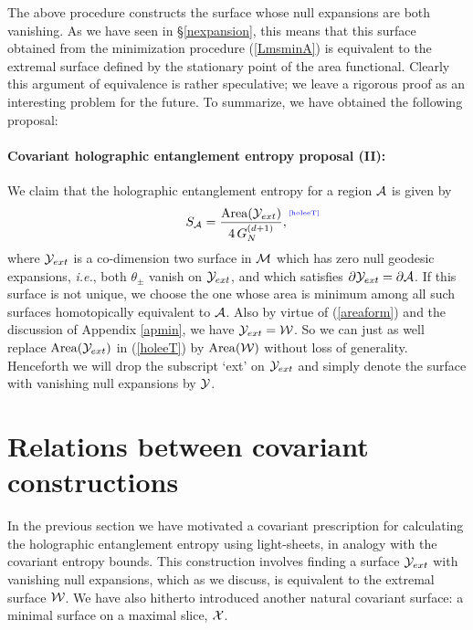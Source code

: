 \documentclass[12pt]{article}
\def\sec#1{\S \;\ref{#1}}
\def\req#1{(\ref{#1})}
\def\App#1{Appendix \ref{#1}}
\def\ie{{\it i.e.}}
\def\p{\partial}
\def\CA{{\cal A}}
\def\CW{{\cal W}}
\def\CX{{\cal X}}
\def\CY{{\cal Y}}
\def\p{\partial}
\def\p{\partial}
\def\Label#1{\label{#1}%
{ \color{blue}{\smash{\hbox to0pt{\raise2ex\hbox{\tiny[#1]}\hss}}}}}
\def\bulk{{\cal M}}
\def\Gms{\CW}
\def\Lms{\CY}
\def\Xms{\CX}
\def\rA{\CA}
\def\brA{\p \CA}
\def\area#1{{\rm Area}(#1)}
\begin{document}
The above procedure constructs the surface whose null expansions are
both vanishing. As we have seen in \sec{nexpansion}, this means that
this surface obtained from the minimization procedure
(\ref{LmsminA}) is equivalent to the extremal surface defined by the
stationary point of the area functional. Clearly this argument of
equivalence is rather speculative; we leave a rigorous proof as an
interesting problem for the future.  To summarize, we have obtained the
following proposal:
 \paragraph{Covariant holographic entanglement entropy proposal (II):}

We claim that the holographic entanglement entropy for a region
$\rA$ is given by
%
\begin{equation}
S_\rA = {\area{\Lms_{ext}}  \over 4 \, G_N^{(d+1)} }, \Label{holeeT}
\end{equation}
%
where $\Lms_{ext}$ is a co-dimension two surface in $\bulk$ which
has zero null geodesic expansions,  \ie, both $\theta_\pm$ vanish on
$\Lms_{ext}$, and which satisfies  $\p\Lms_{ext} =\brA$. If this
surface is not unique, we choose the one whose area is minimum
 among all such surfaces homotopically equivalent to $\rA$.
 Also by virtue of \req{areaform} and the discussion of \App{apmin},
 we have $\Lms_{ext} = \Gms$. So we can just as well replace $\area{\Lms_{ext}}$ in \req{holeeT}
 by $\area{\Gms}$ without loss of generality.
 Henceforth we will drop the subscript `ext' on $\Lms_{ext}$ and
  simply denote the surface with vanishing null expansions by $\Lms$.


\section{Relations between covariant constructions}
\label{covother}

In the previous section we have motivated a covariant prescription
for calculating the holographic entanglement entropy using
light-sheets, in analogy with the covariant entropy bounds. This
construction involves finding a surface $\Lms_{ext}$ with vanishing null
expansions, which as we discuss, is equivalent to the extremal surface
$\Gms$.  We have also hitherto introduced another natural covariant surface: a
minimal surface on a maximal slice, $\Xms$.
\end{document}
